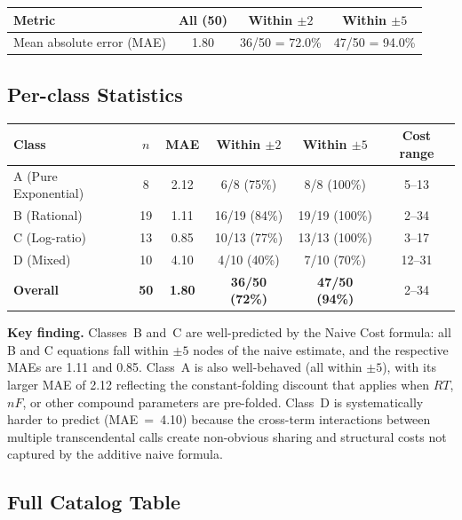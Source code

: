 \documentclass[12pt,a4paper]{article}
\theoremstyle{definition}
\begin{document}
\begin{center}
\begin{tabular}{@{}lccc@{}}
\toprule
\textbf{Metric} & \textbf{All (50)} & \textbf{Within $\pm2$} & \textbf{Within $\pm5$} \\
\midrule
Mean absolute error (MAE) & 1.80 & 36/50 = 72.0\% & 47/50 = 94.0\% \\
\bottomrule
\end{tabular}
\end{center}

\subsection{Per-class Statistics}

\begin{center}
\begin{tabular}{@{}lccccc@{}}
\toprule
\textbf{Class} & \textbf{$n$} & \textbf{MAE} & \textbf{Within $\pm2$} & \textbf{Within $\pm5$} & \textbf{Cost range} \\
\midrule
A (Pure Exponential) & 8  & 2.12 & 6/8 (75\%)  & 8/8 (100\%)  & 5--13 \\
B (Rational)         & 19 & 1.11 & 16/19 (84\%) & 19/19 (100\%) & 2--34 \\
C (Log-ratio)        & 13 & 0.85 & 10/13 (77\%) & 13/13 (100\%) & 3--17 \\
D (Mixed)            & 10 & 4.10 & 4/10 (40\%)  & 7/10 (70\%)   & 12--31 \\
\midrule
\textbf{Overall}     & \textbf{50} & \textbf{1.80} & \textbf{36/50 (72\%)} & \textbf{47/50 (94\%)} & 2--34 \\
\bottomrule
\end{tabular}
\end{center}

\noindent\textbf{Key finding.}
Classes~B and~C are well-predicted by the Naive Cost formula: all B and C
equations fall within $\pm 5$ nodes of the naive estimate, and the respective
MAEs are 1.11 and 0.85.
Class~A is also well-behaved (all within $\pm 5$), with its larger MAE of
2.12 reflecting the constant-folding discount that applies when $RT$, $nF$,
or other compound parameters are pre-folded.
Class~D is systematically harder to predict (MAE~=~4.10) because the
cross-term interactions between multiple transcendental calls create
non-obvious sharing and structural costs not captured by the additive
naive formula.

\subsection{Full Catalog Table}
\label{subsec:catalog}
\end{document}
